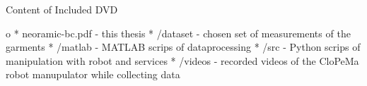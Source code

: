 \app Content of Included DVD

\begitems \style o
* neoramic-bc.pdf - this thesis
* /dataset - chosen set of measurements of the garments
* /matlab - MATLAB scrips of dataprocessing
* /src - Python scrips of manipulation with robot and services
* /videos - recorded videos of the CloPeMa robot manupulator while collecting data
\enditems


